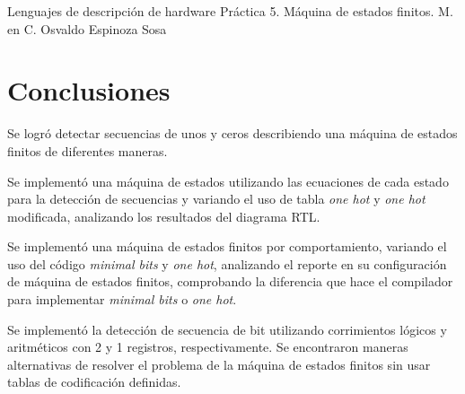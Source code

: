 




	\pnormal
	{Lenguajes de descripción de hardware}
	{Práctica 5. Máquina de estados finitos.}
	{M. en C. Osvaldo Espinoza Sosa}
	\tableofcontents
	
	\newpage 
	\newpage 
	\newpage 

	
	\newpage
	\section{Conclusiones}
	Se logró detectar secuencias de unos y ceros describiendo una máquina de estados finitos de diferentes maneras.
	
	\enter
	
	Se implementó una máquina de estados utilizando las ecuaciones de cada estado para la detección de secuencias y variando el uso de tabla \textit{one hot} y
	\textit{one hot} modificada, analizando los resultados del diagrama RTL.
	
	\enter
	
	Se implementó una máquina de estados finitos por comportamiento, variando el uso del código \textit{minimal bits} y \textit{one hot}, analizando el reporte en su configuración de máquina de estados finitos, comprobando la diferencia que hace el compilador para implementar \textit{minimal bits} o \textit{one hot}.
	
	\enter
	
	Se implementó la detección de secuencia de bit utilizando corrimientos lógicos y aritméticos con 2 y 1 registros, respectivamente. Se encontraron maneras alternativas de resolver el problema de la máquina de estados finitos sin usar tablas de codificación definidas.
	
	\newpage 



